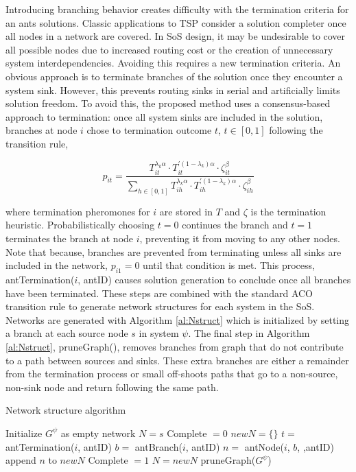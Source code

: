 \documentclass[preprint,12pt,authoryear]{elsarticle}
\begin{document}
Introducing branching behavior creates difficulty with the termination criteria for an ants solutions. Classic applications to TSP consider a solution completer once all nodes in a network are covered. In SoS design, it may be undesirable to cover all possible nodes due to increased routing cost or the creation of unnecessary system interdependencies. Avoiding this requires a new termination criteria. An obvious approach is to terminate branches of the solution once they encounter a system sink. However, this prevents routing sinks in serial and artificially limits solution freedom. To avoid this, the proposed method uses a consensus-based approach to termination: once all system sinks are included in the solution, branches at node $i$ chose to termination outcome $t$, $t\in[0,1]$ following the transition rule,

\begin{equation}
p_{it}=\frac{T_{it}^{\lambda_k\alpha}\cdot T_{it}^{'(1-\lambda_k)\alpha}\cdot\zeta_{it}^{\beta}}{\sum_{h\in[0,1]}T_{ih}^{\lambda_k\alpha}\cdot T_{ih}^{'(1-\lambda_k)\alpha}\cdot\zeta_{ih}^\beta}
\label{eq:Term}
\end{equation}

\noindent where termination pheromones for $i$ are stored in $T$ and $\zeta$ is the termination heuristic. Probabilistically choosing $t=0$ continues the branch and $t=1$ terminates the branch at node $i$, preventing it from moving to any other nodes. Note that because, branches are prevented from terminating unless all sinks are included in the network, $p_{i1}=0$ until that condition is met. This process, antTermination($i$, antID) causes solution generation to conclude once all branches have been terminated. These steps are combined with the standard ACO transition rule to generate network structures for each system in the SoS. Networks are generated with Algorithm \ref{al:Nstruct} which is initialized by setting a branch at each source node $s$ in system $\psi$. The final step in Algorithm \ref{al:Nstruct}, pruneGraph(), removes branches from graph that do not contribute to a path between sources and sinks. These extra branches are either a remainder from the termination process or small off-shoots paths that go to a non-source, non-sink node and return following the same path. 

\begin{algorithm}
	\caption{Network structure algorithm}
	\label{al:Nstruct}
	\begin{algorithmic}[1]
		\State Initialize $G^\psi$ as empty network
		\State $N=s$
		\State Complete $=0$
		\State $newN=\lbrace\rbrace$
		\State $t=$ antTermination($i$, antID)
		\State $b=$ antBranch($i$, antID)
		\State $n=$ antNode($i$, $b$, ,antID)
		\State append $n$ to $newN$
		\EndIf
		\EndFor
		\State Complete $=1$
		\EndIf
		\State $N=newN$
		\EndWhile
		\State pruneGraph($G^\psi$)
		\EndProcedure
	\end{algorithmic}
\end{algorithm}
\end{document}
